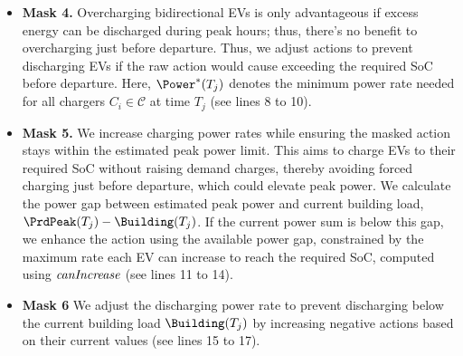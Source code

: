 \begin{itemize}[leftmargin=*]
    \item \textbf{Mask 4.} 
    Overcharging bidirectional EVs is only advantageous if excess energy can be discharged during peak hours; thus, there’s no benefit to overcharging just before departure. Thus, we adjust actions to prevent discharging EVs if the raw action would cause exceeding the required SoC before departure.  Here, $\Power^*(T_j)$ denotes the minimum power rate needed for all chargers $C_i \in \mathcal{C}$ at time $T_j$ (see lines 8 to 10).
    
    \item \textbf{Mask 5.} 
    We increase charging power rates while ensuring the masked action stays within the estimated peak power limit. This aims to charge EVs to their required SoC without raising demand charges, thereby avoiding forced charging just before departure, which could elevate peak power. 
    We calculate the power gap between estimated peak power and current building load, $\PrdPeak(T_j) - \Building(T_j)$. If the current power sum is below this gap, we enhance the action using the available power gap, constrained by the maximum rate each EV can increase to reach the required SoC, computed using ${\it canIncrease}$ (see lines 11 to 14). 
    
    \item \textbf{Mask 6} We adjust the discharging power rate to prevent discharging below the current building load $\Building(T_j)$ by increasing negative actions based on their current values (see lines 15 to 17). 
\end{itemize} 


